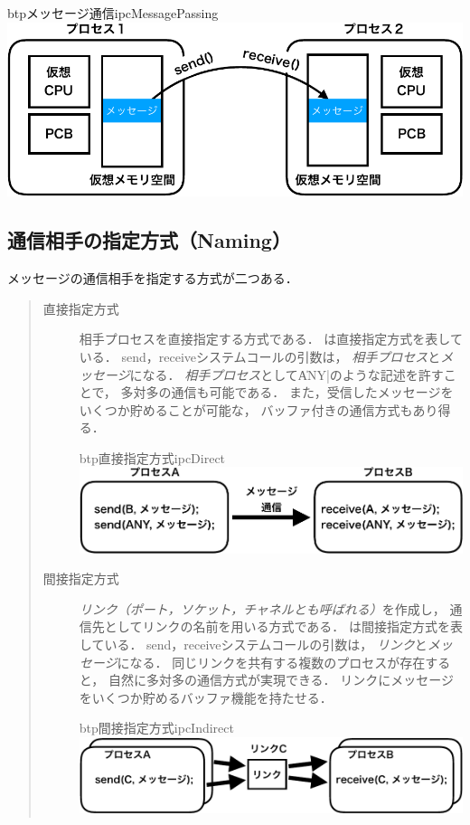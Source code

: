\begin{myfig}{btp}{メッセージ通信}{ipcMessagePassing}
  \includegraphics[scale=0.6]{Fig/ipcMessagePassing-crop.pdf}
\end{myfig}

\subsection{通信相手の指定方式（Naming）}
メッセージの通信相手を指定する方式が二つある．

\begin{quote}
  \begin{description}
  \item[直接指定方式]
    相手プロセスを直接指定する方式である．
    は直接指定方式を表している．
    send，receiveシステムコールの引数は，
    \emph{相手プロセス}と\emph{メッセージ}になる．
    \emph{相手プロセス}として\|ANY|のような記述を許すことで，
    多対多の通信も可能である．
    また，受信したメッセージをいくつか貯めることが可能な，
    バッファ付きの通信方式もあり得る．
    \begin{myfig}{btp}{直接指定方式}{ipcDirect}
      \includegraphics[scale=0.6]{Fig/ipcDirect-crop.pdf}
    \end{myfig}
  \item[間接指定方式]
    \emph{リンク（ポート，ソケット，チャネルとも呼ばれる）}を作成し，
    通信先としてリンクの名前を用いる方式である．
    は間接指定方式を表している．
    send，receiveシステムコールの引数は，
    \emph{リンク}と\emph{メッセージ}になる．
    同じリンクを共有する複数のプロセスが存在すると，
    自然に多対多の通信方式が実現できる．
    リンクにメッセージをいくつか貯めるバッファ機能を持たせる．
    \begin{myfig}{btp}{間接指定方式}{ipcIndirect}
      \includegraphics[scale=0.6]{Fig/ipcIndirect-crop.pdf}
    \end{myfig}
  \end{description}
\end{quote}


